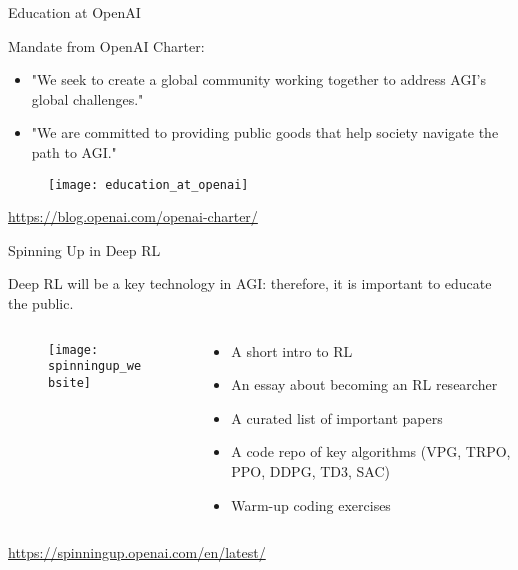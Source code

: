 \begin{frame}{Education at OpenAI}

Mandate from OpenAI Charter: 
\begin{itemize}
\item "We seek to create a global community working together to address AGI’s global challenges."
\item "We are committed to providing public goods that help society navigate the path to AGI."
\end{itemize}
\begin{figure}
\centering
\texttt{[image: education\_at\_openai]}
\end{figure}

\begin{center}
\url{https://blog.openai.com/openai-charter/}
\end{center}
\end{frame}

\begin{frame}{Spinning Up in Deep RL}

Deep RL will be a key technology in AGI: therefore, it is important to educate the public.
\begin{columns}
\begin{column}{0.5\textwidth}
\begin{figure}
\centering
\texttt{[image: spinningup\_website]}
\end{figure}
\end{column}
\begin{column}{0.5\textwidth}
\begin{itemize}
\item A short intro to RL 
\item An essay about becoming an RL researcher
\item A curated list of important papers
\item A code repo of key algorithms (VPG, TRPO, PPO, DDPG, TD3, SAC)
\item Warm-up coding exercises
\end{itemize}
\end{column}
\end{columns}
\begin{center}
\url{https://spinningup.openai.com/en/latest/}
\end{center}

\end{frame}


